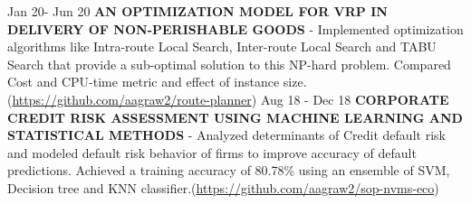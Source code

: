 \begin{cvskills}
  \cvskill
    {Jan 20- Jun 20}
    {\textbf{AN OPTIMIZATION MODEL FOR VRP IN DELIVERY OF NON-PERISHABLE GOODS} - Implemented optimization algorithms like Intra-route Local Search, Inter-route Local Search and TABU Search that provide a sub-optimal solution to this NP-hard problem. Compared Cost and CPU-time metric and effect of instance size.(\url{https://github.com/aagraw2/route-planner})}
  \cvskill
    {Aug 18 - Dec 18}
    {\textbf{CORPORATE CREDIT RISK ASSESSMENT USING MACHINE LEARNING AND STATISTICAL METHODS} - Analyzed determinants of Credit default risk and modeled default risk behavior of firms to improve accuracy of default predictions. Achieved a training accuracy of 80.78\% using an ensemble of SVM, Decision tree and KNN classifier.(\url{https://github.com/aagraw2/sop-nvms-eco})}
\end{cvskills}  